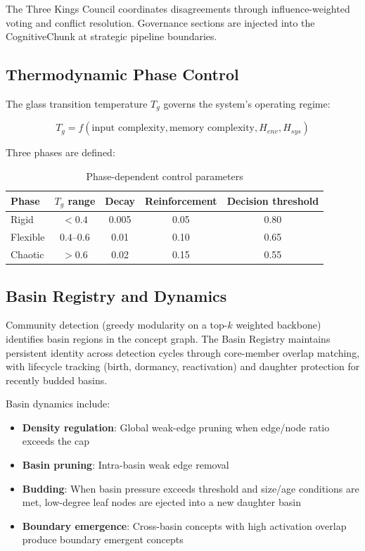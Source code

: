 \documentclass[11pt,a4paper]{article}
\begin{document}
The Three Kings Council coordinates disagreements through influence-weighted voting and conflict resolution. Governance sections are injected into the CognitiveChunk at strategic pipeline boundaries.

\subsection{Thermodynamic Phase Control}

The glass transition temperature $T_g$ governs the system's operating regime:

\begin{equation}
T_g = f(\text{input complexity}, \text{memory complexity}, H_{env}, H_{sys})
\label{eq:tg}
\end{equation}

Three phases are defined:

\begin{table}[H]
\centering
\caption{Phase-dependent control parameters}
\label{tab:phases}
\begin{tabular}{@{}lcccc@{}}
\toprule
\textbf{Phase} & \textbf{$T_g$ range} & \textbf{Decay} & \textbf{Reinforcement} & \textbf{Decision threshold} \\
\midrule
Rigid & $< 0.4$ & 0.005 & 0.05 & 0.80 \\
Flexible & $0.4$--$0.6$ & 0.01 & 0.10 & 0.65 \\
Chaotic & $> 0.6$ & 0.02 & 0.15 & 0.55 \\
\bottomrule
\end{tabular}
\end{table}

\subsection{Basin Registry and Dynamics}

Community detection (greedy modularity on a top-$k$ weighted backbone) identifies basin regions in the concept graph. The Basin Registry maintains persistent identity across detection cycles through core-member overlap matching, with lifecycle tracking (birth, dormancy, reactivation) and daughter protection for recently budded basins.

Basin dynamics include:
\begin{itemize}[nosep]
    \item \textbf{Density regulation}: Global weak-edge pruning when edge/node ratio exceeds the cap
    \item \textbf{Basin pruning}: Intra-basin weak edge removal
    \item \textbf{Budding}: When basin pressure exceeds threshold and size/age conditions are met, low-degree leaf nodes are ejected into a new daughter basin
    \item \textbf{Boundary emergence}: Cross-basin concepts with high activation overlap produce boundary emergent concepts
\end{itemize}
\end{document}
